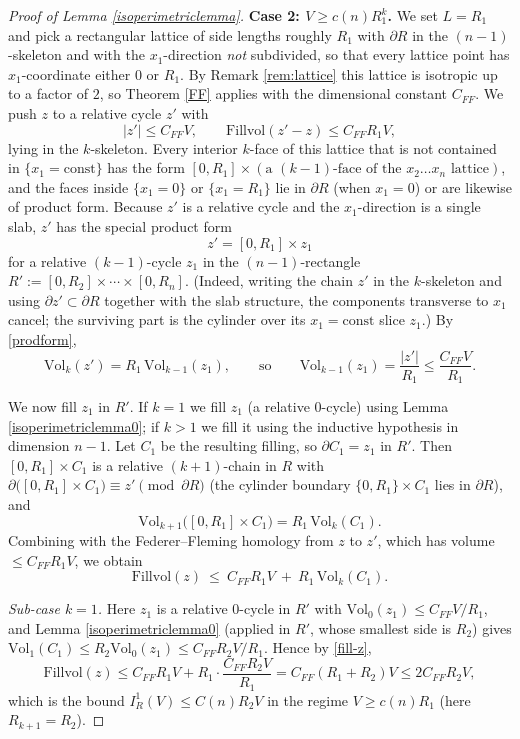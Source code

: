 \documentclass{amsart}
\newtheorem*{theorem 1}{Theorem 1}
\newtheorem*{theorem 2}{Theorem 2}
\newtheorem*{theorem 3}{Theorem 3}
\numberwithin{equation}{section}
\newcommand{\Vol}{\textrm{Vol}}
\begin{document}
\begin{proof} [Proof of Lemma \ref{isoperimetriclemma}]
\medskip
\noindent\textbf{Case 2: $V \ge c(n) R_1^k$.}
We set $L = R_1$ and pick a rectangular lattice of side lengths
roughly $R_1$ with $\partial R$ in the $(n-1)$-skeleton and with the
$x_1$-direction \emph{not} subdivided, so that every lattice point
has $x_1$-coordinate either $0$ or $R_1$.  By
Remark \ref{rem:lattice} this lattice is isotropic up to a factor
of $2$, so Theorem \ref{FF} applies with the dimensional constant
$C_{FF}$.  We push $z$ to a relative cycle $z'$ with
$$ |z'| \le C_{FF} V, \qquad \mathrm{Fillvol}(z'-z) \le C_{FF} R_1 V, $$
lying in the $k$-skeleton.  Every interior $k$-face of this lattice
that is not contained in $\{x_1 = \text{const}\}$ has the form
$[0,R_1] \times (\text{a }(k-1)\text{-face of the }x_2\dots x_n
\text{ lattice})$, and the faces inside $\{x_1=0\}$ or
$\{x_1=R_1\}$ lie in $\partial R$ (when $x_1 = 0$) or are likewise
of product form.  Because $z'$ is a relative cycle and the
$x_1$-direction is a single slab, $z'$ has the special product form
\begin{equation} \label{prodform}
 z' = [0,R_1] \times z_1
\end{equation}
for a relative $(k-1)$-cycle $z_1$ in the $(n-1)$-rectangle
$R' := [0,R_2] \times \cdots \times [0,R_n]$.  (Indeed, writing the
chain $z'$ in the $k$-skeleton and using $\partial z' \subset
\partial R$ together with the slab structure, the components
transverse to $x_1$ cancel; the surviving part is the cylinder over
its $x_1=\text{const}$ slice $z_1$.)  By \eqref{prodform},
$$ \Vol_k(z') = R_1\, \Vol_{k-1}(z_1), \qquad\text{so}\qquad
   \Vol_{k-1}(z_1) = \frac{|z'|}{R_1} \le \frac{C_{FF} V}{R_1}. $$

We now fill $z_1$ in $R'$.  If $k = 1$ we fill $z_1$ (a relative
$0$-cycle) using Lemma \ref{isoperimetriclemma0}; if $k > 1$ we
fill it using the inductive hypothesis in dimension $n-1$.  Let
$C_1$ be the resulting filling, so $\partial C_1 = z_1$ in $R'$.
Then $[0,R_1] \times C_1$ is a relative $(k+1)$-chain in $R$ with
$\partial\big([0,R_1]\times C_1\big) \equiv z' \pmod{\partial R}$
(the cylinder boundary $\{0,R_1\}\times C_1$ lies in $\partial R$),
and
$$ \Vol_{k+1}\big([0,R_1]\times C_1\big) = R_1\,\Vol_k(C_1). $$
Combining with the Federer--Fleming homology from $z$ to $z'$,
which has volume $\le C_{FF} R_1 V$, we obtain
\begin{equation} \label{fill-z}
 \mathrm{Fillvol}(z) \ \le\ C_{FF} R_1 V \ +\ R_1\,\Vol_k(C_1).
\end{equation}

\emph{Sub-case $k=1$.}  Here $z_1$ is a relative $0$-cycle in
$R'$ with $\Vol_0(z_1) \le C_{FF} V / R_1$, and
Lemma \ref{isoperimetriclemma0} (applied in $R'$, whose smallest
side is $R_2$) gives $\Vol_1(C_1) \le R_2 \Vol_0(z_1) \le
C_{FF} R_2 V / R_1$.  Hence by \eqref{fill-z},
$$ \mathrm{Fillvol}(z) \le C_{FF} R_1 V + R_1 \cdot
   \frac{C_{FF} R_2 V}{R_1} = C_{FF}(R_1 + R_2) V \le 2 C_{FF} R_2 V, $$
which is the bound $I_R^1(V) \le C(n) R_2 V$ in the regime
$V \ge c(n) R_1$ (here $R_{k+1}=R_2$).


\end{proof}
\end{document}
